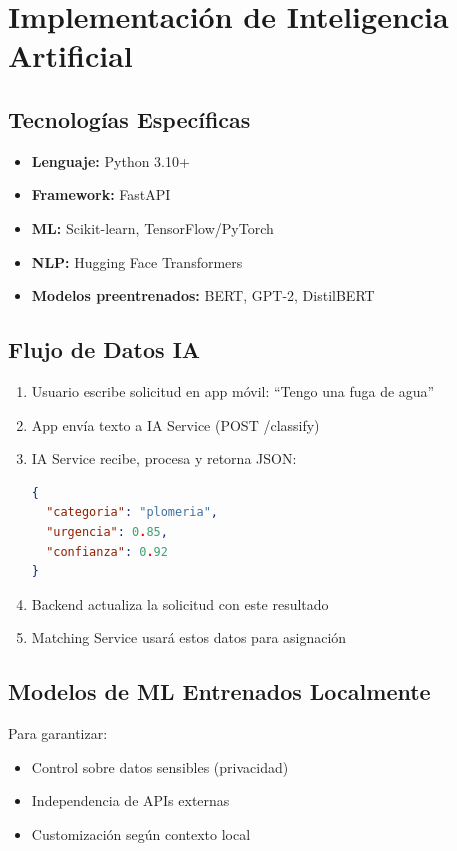 \documentclass[12pt,a4paper,spanish]{article}
\begin{document}
\newpage

\section{Implementación de Inteligencia Artificial}

\subsection{Tecnologías Específicas}

\begin{itemize}
    \item \textbf{Lenguaje:} Python 3.10+
    \item \textbf{Framework:} FastAPI
    \item \textbf{ML:} Scikit-learn, TensorFlow/PyTorch
    \item \textbf{NLP:} Hugging Face Transformers
    \item \textbf{Modelos preentrenados:} BERT, GPT-2, DistilBERT
\end{itemize}

\subsection{Flujo de Datos IA}

\begin{enumerate}
    \item Usuario escribe solicitud en app móvil: ``Tengo una fuga de agua''
    \item App envía texto a IA Service (POST /classify)
    \item IA Service recibe, procesa y retorna JSON:
    \begin{lstlisting}[language=json]
{
  "categoria": "plomeria",
  "urgencia": 0.85,
  "confianza": 0.92
}
    \end{lstlisting}
    \item Backend actualiza la solicitud con este resultado
    \item Matching Service usará estos datos para asignación
\end{enumerate}

\subsection{Modelos de ML Entrenados Localmente}

Para garantizar:
\begin{itemize}
    \item Control sobre datos sensibles (privacidad)
    \item Independencia de APIs externas
    \item Customización según contexto local
\end{itemize}
\end{document}
